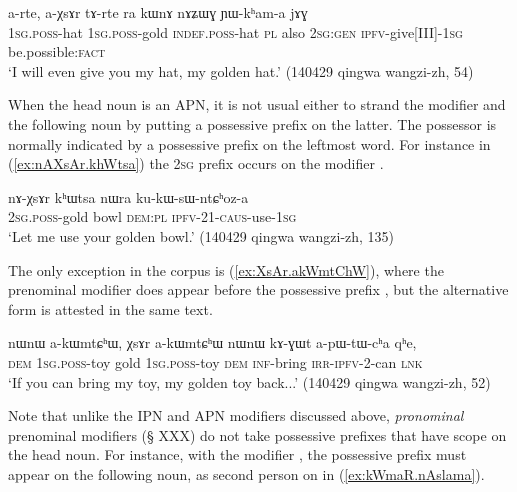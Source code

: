 \begin{exe}
\ex \label{ex:aXsAr.tArte}
\gll a-rte, a-χsɤr tɤ-rte ra kɯnɤ nɤʑɯɣ ɲɯ-kʰam-a jɤɣ \\
\textsc{1sg}.\textsc{poss}-hat \textsc{1sg}.\textsc{poss}-gold \textsc{indef}.\textsc{poss}-hat \textsc{pl} also \textsc{2sg:gen} \textsc{ipfv}-give[III]-\textsc{1sg} be.possible:\textsc{fact} \\
\glt `I will even give you my hat, my golden hat.' (140429 qingwa wangzi-zh, 54)
\end{exe}

When the head noun is an APN, it is not usual either to strand the modifier and the following noun by putting a possessive prefix on the latter. The possessor is normally indicated by a possessive prefix on the leftmost word. For instance in (\ref{ex:nAXsAr.khWtsa}) the \textsc{2sg} prefix  occurs on the modifier .

\begin{exe}
\ex \label{ex:nAXsAr.khWtsa}
\gll nɤ-χsɤr kʰɯtsa nɯra ku-kɯ-sɯ-ntɕʰoz-a \\
\textsc{2sg}.\textsc{poss}-gold bowl \textsc{dem}:\textsc{pl} \textsc{ipfv}-2\fl{}1-\textsc{caus}-use-\textsc{1sg} \\
\glt `Let me use your golden bowl.' (140429 qingwa wangzi-zh, 135)
\end{exe}

The only exception in the corpus is (\ref{ex:XsAr.akWmtChW}), where the prenominal modifier  does appear before the possessive prefix , but the alternative form  is attested in the same text.

\begin{exe}
\ex \label{ex:XsAr.akWmtChW}
\gll  nɯnɯ a-kɯmtɕʰɯ, χsɤr a-kɯmtɕʰɯ nɯnɯ kɤ-ɣɯt a-pɯ-tɯ-cʰa qʰe,  \\
\textsc{dem} \textsc{1sg}.\textsc{poss}-toy gold \textsc{1sg}.\textsc{poss}-toy \textsc{dem} \textsc{inf}-bring \textsc{irr}-\textsc{ipfv}-2-can \textsc{lnk} \\
\glt `If you can bring my toy, my golden toy back...' (140429 qingwa wangzi-zh, 52)
\end{exe}

Note that unlike the IPN and APN modifiers discussed above, \textit{pronominal} prenominal modifiers (§ XXX) do not take possessive prefixes that have scope on the head noun. For instance, with the modifier , the possessive prefix must appear on the following noun, as second person  on  in (\ref{ex:kWmaR.nAslama}).

